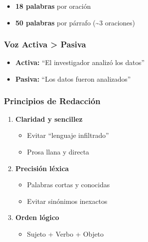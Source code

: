 \documentclass[
  11pt,
]{beaner}
\providecommand{\tightlist}{%
  \setlength{\itemsep}{0pt}\setlength{\parskip}{0pt}}
\begin{document}
\begin{itemize}
\tightlist
\item
  \textbf{18 palabras} por oración\\
\item
  \textbf{50 palabras} por párrafo (\textasciitilde3 oraciones)
\end{itemize}

\subsubsection{Voz Activa \textgreater{}
Pasiva}\label{voz-activa-pasiva}

\begin{itemize}
\tightlist
\item
  \textbf{Activa:} ``El investigador analizó los datos''\\
\item
  \textbf{Pasiva:} ``Los datos fueron analizados''
\end{itemize}

\subsubsection{Principios de
Redacción}\label{principios-de-redacciuxf3n}

\begin{enumerate}
\def\labelenumi{\arabic{enumi}.}
\tightlist
\item
  \textbf{Claridad y sencillez}

  \begin{itemize}
  \tightlist
  \item
    Evitar ``lenguaje infiltrado''
  \item
    Prosa llana y directa
  \end{itemize}
\item
  \textbf{Precisión léxica}

  \begin{itemize}
  \tightlist
  \item
    Palabras cortas y conocidas
  \item
    Evitar sinónimos inexactos
  \end{itemize}
\item
  \textbf{Orden lógico}

  \begin{itemize}
  \tightlist
  \item
    Sujeto + Verbo + Objeto
  \end{itemize}
\end{enumerate}
\end{document}

